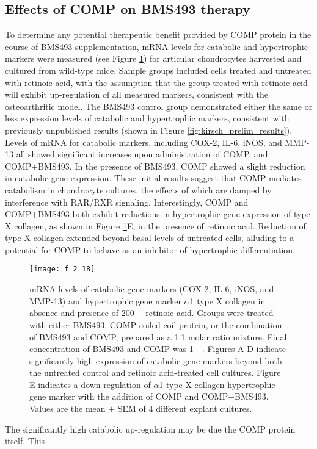 \begin{refsection}
\subsection{Effects of COMP on BMS493 therapy}

To determine any potential therapeutic benefit provided by COMP protein in the
course of BMS493 supplementation, mRNA levels for catabolic and hypertrophic
markers were measured (see Figure \ref{fig:pcr_panel}) for articular
chondrocytes harvested and cultured from wild-type mice. Sample groups included
cells treated and untreated with retinoic acid, with the assumption that the
group treated with retinoic acid will exhibit up-regulation of all measured
markers, consistent with the  osteoarthritic
model.\cite{Davies2009,Cohen2006a} The BMS493 control group demonstrated either
the same or less expression levels of catabolic and hypertrophic markers,
consistent with previously unpublished results (shown in Figure
\ref{fig:kirsch_prelim_results}).
Levels of mRNA for catabolic markers, including COX-2, IL-6, iNOS, and MMP-13
all showed significant increases upon administration of COMP, and COMP+BMS493.
In the presence of BMS493, COMP showed a slight reduction in catabolic gene
expression. These initial results suggest that COMP mediates catabolism in
chondrocyte cultures, the effects of which are damped by interference with
RAR/RXR signaling. Interestingly, COMP and COMP+BMS493 both exhibit reductions
in hypertrophic gene expression of type X collagen, as shown in Figure
\ref{fig:pcr_panel}E, in the presence of retinoic acid. Reduction of type X
collagen extended beyond basal levels of untreated cells, alluding to a
potential for COMP to behave as an inhibitor of hypertrophic differentiation.
\begin{figure}[h!] \centering \texttt{[image: f\_2\_18]}
    \caption{mRNA levels of catabolic gene markers (COX-2, IL-6, iNOS, and
        MMP-13) and hypertrophic gene marker ${\alpha}$1 type X collagen in
        absence and presence of \SI{200}{\nano\moLar} retinoic acid. Groups were
        treated with either BMS493, COMP coiled-coil protein, or the
        combination of BMS493 and COMP, prepared as a 1:1 molar ratio mixture.
        Final concentration of BMS493 and COMP was \SI{1}{\micro\moLar}. Figures
        A-D indicate significantly high expression of catabolic gene markers
        beyond both the untreated control and retinoic acid-treated cell
        cultures. Figure E indicates a down-regulation of ${\alpha}$1 type X
        collagen hypertrophic gene marker with the addition of COMP and
        COMP+BMS493. Values are the mean ${\pm}$ SEM of 4 different explant
    cultures.}
    \label{fig:pcr_panel} \end{figure}
The significantly high catabolic up-regulation may be due the COMP protein
itself. This 


\end{refsection}
